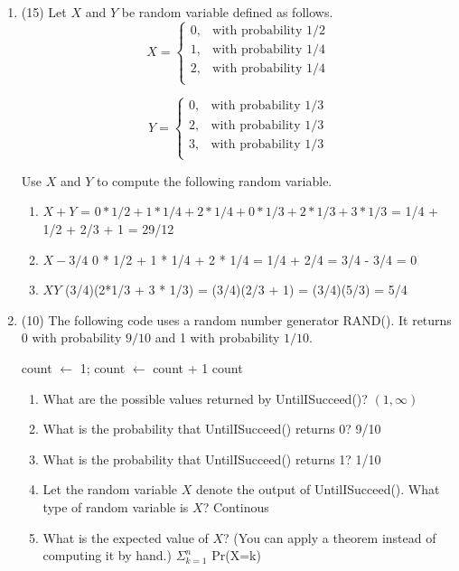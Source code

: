 \documentclass[12pt]{article}
\begin{document}
\begin{enumerate}
\item (15)
Let $X$ and $Y$ be random variable defined as follows.
 $$X = \begin{cases}
 0, &\textrm{with probability }1/2 \\
 1, &\textrm{with probability }1/4 \\
 2, &\textrm{with probability }1/4 \\
 \end{cases}$$
 
 $$Y = \begin{cases}
 0, &\textrm{with probability }1/3 \\
 2, &\textrm{with probability }1/3 \\
 3, &\textrm{with probability }1/3 \\
 \end{cases}$$
 
 Use $X$ and $Y$ to compute the following random variable.
 \begin{enumerate}
 \item $X+Y$ = $0 * 1/2 + 1 * 1/4 + 2 * 1/4 + 0 * 1/3 + 2 * 1/3 + 3 * 1/3$ = 1/4 + 1/2 + 2/3 + 1 = 29/12
 \item $X - 3/4$ 0 * 1/2 + 1 * 1/4 + 2 * 1/4 = 1/4 + 2/4 = 3/4 - 3/4 = 0
 \item $XY$ (3/4)(2*1/3 + 3 * 1/3) = (3/4)(2/3 + 1) = (3/4)(5/3) = 5/4
 \end{enumerate}

\item (10)
The following code uses a random number generator RAND(). It returns 0 with probability $9/10$ and 1 with probability $1/10$. 
  
 \begin{algorithm}
 \begin{algorithmic}[1]
 \State count $\gets$ 1;
  \State count $\gets$ count + 1
 \EndWhile
 \State \Return count
 \EndProcedure
\end{algorithmic}
\end{algorithm}
\begin{enumerate}
 \item What are the possible values returned by UntilISucceed()? $(1,\infty)$
 \item What is the probability that UntilISucceed() returns 0? 9/10
 \item What is the probability that UntilISucceed() returns 1? 1/10
 \item Let the random variable $X$ denote the output of UntilISucceed(). What type of random 
 variable is $X$? Continous
 \item What is the expected value of $X$? (You can apply a theorem instead of computing it by 
 hand.) $\Sigma_{k=1}^n$ Pr(X=k)
\end{enumerate}


\end{enumerate}
\end{document}
